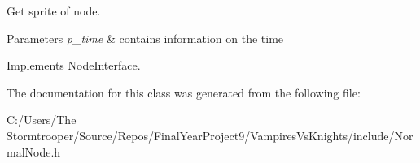 Get sprite of node. 


\begin{DoxyParams}{Parameters}
{\em p\+\_\+time} & contains information on the time \\
\hline
\end{DoxyParams}


Implements \mbox{\hyperlink{class_node_interface_a3d79c567537e9ffa7d2fc821495879fb}{Node\+Interface}}.



The documentation for this class was generated from the following file\+:\begin{DoxyCompactItemize}
\item 
C\+:/\+Users/\+The Stormtrooper/\+Source/\+Repos/\+Final\+Year\+Project9/\+Vampires\+Vs\+Knights/include/Normal\+Node.\+h\end{DoxyCompactItemize}
